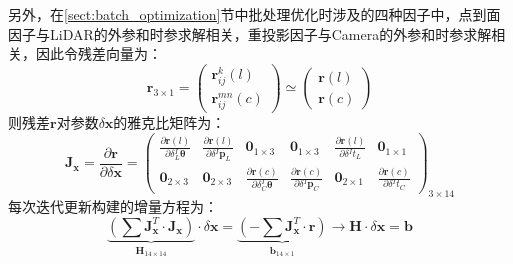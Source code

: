 另外，在\ref{sect:batch_optimization}节中批处理优化时涉及的四种因子中，点到面因子与LiDAR的外参和时参求解相关，重投影因子与Camera的外参和时参求解相关，因此令残差向量为：
\begin{equation}
  \boldsymbol{r}_{3\times 1}=\begin{pmatrix}
    \boldsymbol{r}_{ij}^k(l) \\\boldsymbol{r}_{ij}^{mn}(c)
  \end{pmatrix}
  \simeq
  \begin{pmatrix}
    \boldsymbol{r}(l) \\\boldsymbol{r}(c)
  \end{pmatrix}
\end{equation}
则残差$\boldsymbol{r}$对参数$\delta\boldsymbol{x}$的雅克比矩阵为：
\begin{equation}
  \boldsymbol{J}_{\boldsymbol{x}}=\frac{\partial \boldsymbol{r}}{\partial \delta \boldsymbol{x}}=
  \begin{pmatrix}
    \frac{\partial \boldsymbol{r}(l)}{\partial \delta {^{I}_{L}\boldsymbol{\theta}}} &
    \frac{\partial \boldsymbol{r}(l)}{\partial \delta {^{I}\boldsymbol{p}_L}}        &
    \boldsymbol{0}_{1\times 3}                                                       &
    \boldsymbol{0}_{1\times 3}                                                       &
    \frac{\partial \boldsymbol{r}(l)}{\partial \delta {^{I}t_{L}}}                   &
    \boldsymbol{0}_{1\times 1}                                                         \\
    \boldsymbol{0}_{2\times 3}                                                       &
    \boldsymbol{0}_{2\times 3}                                                       &
    \frac{\partial \boldsymbol{r}(c)}{\partial \delta {^{I}_{C}\boldsymbol{\theta}}} &
    \frac{\partial \boldsymbol{r}(c)}{\partial \delta {^{I}\boldsymbol{p}_C}}        &
    \boldsymbol{0}_{2\times 1}                                                       &
    \frac{\partial \boldsymbol{r}(c)}{\partial \delta {^{I}t_{C}}}
  \end{pmatrix}_{3\times 14}
\end{equation}
每次迭代更新构建的增量方程为：
\begin{equation}
  \underbrace{\left(
    \sum\boldsymbol{J}_{\boldsymbol{x}}^T\cdot\boldsymbol{J}_{\boldsymbol{x}}
    \right)}_{\boldsymbol{H}_{14\times 14}}
  \cdot\delta\boldsymbol{x}=
  \underbrace{\left( -\sum \boldsymbol{J}_{\boldsymbol{x}}^T\cdot\boldsymbol{r}\right)}
  _{\boldsymbol{b}_{14\times 1}}\to\boldsymbol{H}
  \cdot\delta\boldsymbol{x}=\boldsymbol{b}
\end{equation}
